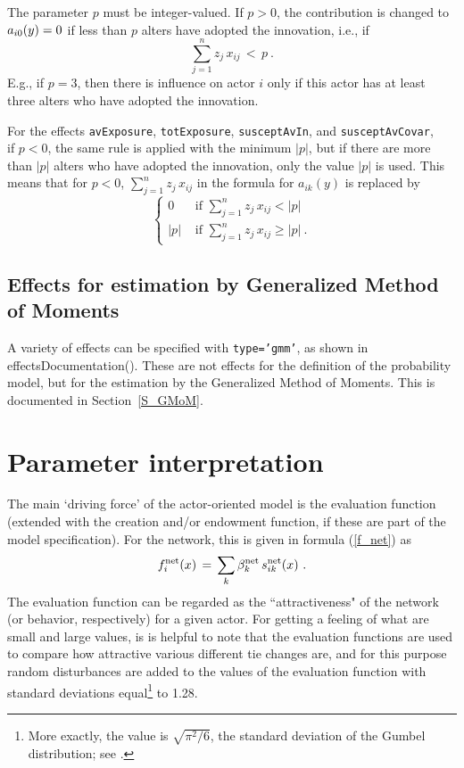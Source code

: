 \documentclass[a4paper,fleqn,11pt]{article}
\newcommand{\+}{\, + \,}
\newcommand{\vit}{\theenumi}
\begin{document}
The parameter $p$ must be integer-valued. If $p > 0$, the contribution is
changed to $a_{i\vit}(y) = 0$ if less than $p$ alters
have adopted the innovation, i.e., if
\[
\sum_{j=1}^n  z_j\, x_{ij} \, < \, p \ .
\]
E.g., if $p=3$, then there is influence on actor $i$ only if
this actor has at least three alters who have adopted the innovation.

For the effects \verb|avExposure|, \verb|totExposure|, \verb|susceptAvIn|,
and \verb|susceptAvCovar|, \\
if $p < 0$,
the same rule is applied with the minimum $|p|$, but if there
are more than $|p|$ alters who have adopted the innovation,
only the value $|p|$ is used.
This means that for $p < 0$,
$\sum_{j=1}^n  z_j\, x_{ij}$ in the formula for
 $a_{ik}(y) $ is replaced by
 \[
 \left\{ \begin{array}{ll}
                0 & \text{  if  } \sum_{j=1}^n  z_j\, x_{ij} < |p| \\[0.9ex]
                |p| & \text{  if  } \sum_{j=1}^n  z_j\, x_{ij} \geq |p| \ .
     \end{array} \right.
 \]

\subsection{Effects for estimation by Generalized Method of Moments}

A variety of effects can be specified with \texttt{type='gmm'},
as shown in \textsf{effectsDocumentation()}.
These are not effects for the definition of the probability model,
but for the estimation by the Generalized Method of Moments.
This is documented in Section~\ref{S_GMoM}.

\newpage
\section{Parameter interpretation}
\label{S_interpret}

The main `driving force' of the actor-oriented model
is the evaluation function
(extended with the creation and/or endowment function, if these are
part of the model specification).
For the network, this is given in formula (\ref{f_net}) as
\[
f^{\rm net}_i(x) \, = \, \sum_k \beta^{\rm net}_k \, s^{\rm net}_{ik}(x)   \ .
\]
The evaluation function can be regarded as the ``attractiveness"
of the network (or behavior, respectively) for a given actor.
For getting a feeling of what are small and large values,
is is helpful to note that the evaluation functions are
used to compare how attractive various different tie changes are,
and for this purpose random disturbances are added
to the values of the evaluation function with standard deviations
equal\footnote{More exactly, the value is $\sqrt{\pi^2/6}$,
the standard deviation of the Gumbel
distribution; see \citet{Snijders01}.} to 1.28.
\end{document}

